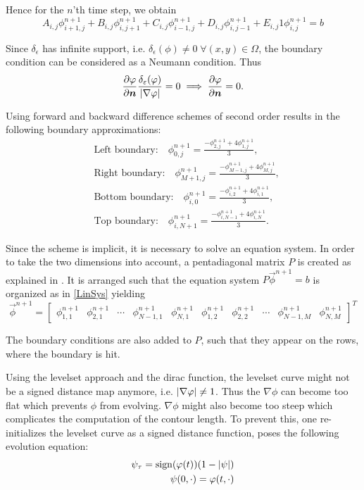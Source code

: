 Hence for the $n$'th time step, we obtain
\begin{equation}
A_{i,j}\phi_{i+1,j}^{n+1} + B_{i,j}\phi_{i,j+1}^{n+1} + C_{i,j}\phi_{i-1,j}^{n+1} + D_{i,j}\phi_{i,j-1}^{n+1} + E_{i,j}1\phi_{i,j}^{n+1} = b\label{LinSys}
\end{equation}

Since $\delta_\epsilon$ has infinite support, i.e. $\delta_\epsilon(\phi)\neq 0\;\forall (x,y)\in\Omega$, the boundary condition can be considered as a Neumann condition. Thus
\begin{equation}
\frac{\partial \varphi}{\partial \boldsymbol{n} }\frac{\delta_\varepsilon(\varphi)}{\left| {\nabla\varphi} \right|}=0 \implies \frac{\partial \varphi}{\partial \boldsymbol{n} }=0.
\end{equation}

Using forward and backward difference schemes of second order results in the following boundary approximations:
\begin{align*}
&\text{Left boundary:}\quad \phi_{0,j}^{n+1} = \frac{-\phi_{2,j}^{n+1}+4\phi_{1,j}^{n+1}}{3},\\
&\text{Right boundary:}\quad \phi_{M+1,j}^{n+1} = \frac{-\phi_{M-1,j}^{n+1}+4\phi_{M,j}^{n+1}}{3},\\
&\text{Bottom boundary:}\quad \phi_{i,0}^{n+1} = \frac{-\phi_{i,2}^{n+1}+4\phi_{i,1}^{n+1}}{3},\\
&\text{Top boundary:}\quad \phi_{i,N+1}^{n+1} = \frac{-\phi_{i,N-1}^{n+1}+4\phi_{i,N}^{n+1}}{3}.
\end{align*}

Since the scheme is implicit, it is necessary to solve an equation system. In order to take the two dimensions into account, a pentadiagonal matrix $P$ is created as explained in \cite{holm.07}. It is arranged such that the equation system $P\vec{\phi}^{n+1} = b$ is organized as in \eqref{LinSys} yielding
\begin{equation}\label{phivec}
\vec{\phi}^{n+1} = 
\begin{bmatrix}
  \phi_{1,1}^{n+1} & \phi_{2,1}^{n+1} & \cdots & \phi_{N-1,1}^{n+1} & \phi_{N,1}^{n+1} & \phi_{1,2}^{n+1} & \phi_{2,2}^{n+1} & \cdots 
  & \phi_{N-1,M}^{n+1} & \phi_{N,M}^{n+1}
\end{bmatrix}^T
\end{equation}

The boundary conditions are also added to $P$, such that they appear on the rows, where the boundary is hit.

Using the levelset approach and the dirac function, the levelset curve might not be a signed distance map anymore, i.e. $\left| {\nabla \varphi} \right|\neq 1$. Thus the $\nabla\phi$ can become too flat which prevents $\phi$ from evolving. $\nabla\phi$ might also become too steep which complicates the computation of the contour length. To prevent this, one re-initializes the levelset curve as a signed distance function, \cite{suss.94} poses the following evolution equation:
\begin{align}
\psi_\tau = \sign(\phi(t))(1-\abs{\psi})\label{reinit1}\\
\psi(0,\cdot) = \phi(t,\cdot)
\end{align}

